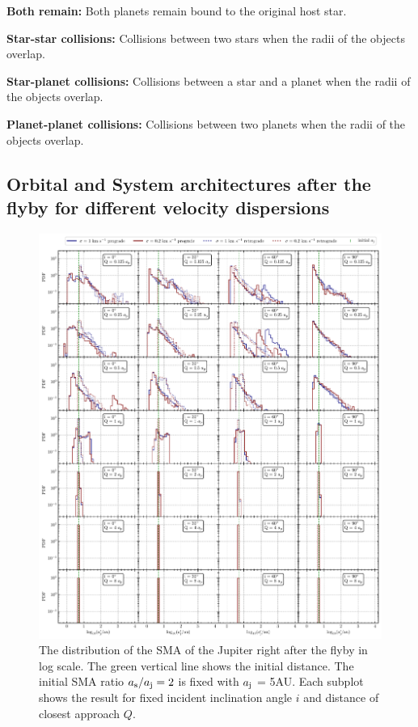 \documentclass[twocolumn]{aastex63}
\begin{document}
\textbf{Both remain:} Both planets remain bound to the original host star.

\textbf{Star-star collisions:} Collisions between two stars when the radii of the objects overlap.

\textbf{Star-planet collisions:} Collisions between a star and a planet when the radii of the objects overlap.

\textbf{Planet-planet collisions:} Collisions between two planets when the radii of the objects overlap.

\subsection{Orbital and System architectures after the flyby for different velocity dispersions}

\begin{figure}
    \includegraphics[width=\textwidth]{figs/aj-flyby-sigma.pdf}
    \caption{The distribution of the SMA of the Jupiter right after the flyby in log scale. The green vertical line shows the initial distance. The initial SMA ratio $a_{\rm s}/a_{\rm j}=2$ is fixed with $a_{\rm j}$ = 5AU. Each subplot shows the result for fixed incident inclination angle $i$ and distance of closest approach $Q$.}
    \label{fig:aj-flyby-sigma}
\end{figure}
\end{document}
